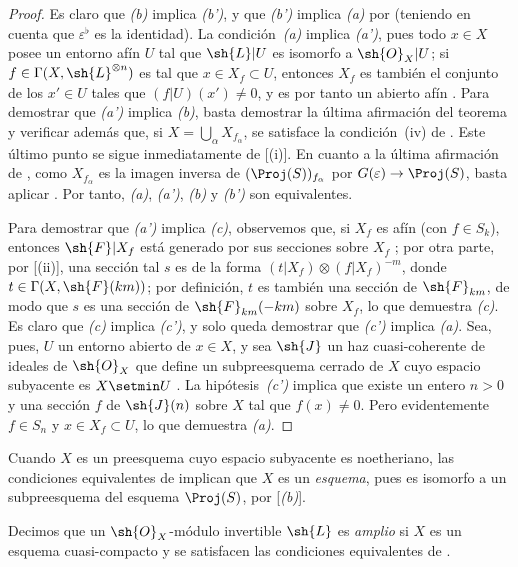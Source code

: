\documentclass[oneside,10pt]{amsart}
\makeatletter
\newcommand{\ega@arrow}[2]{\mathchoice{#1}{#2}{#2}{#2}}
\renewcommand{\to}{\ega@arrow{\longrightarrow}{\rightarrow}}
\let\EGAOriginalLabel\label
\renewcommand{\label}[1]{\phantomsection\EGAOriginalLabel{#1}}
\makeatother
\begin{document}
\begin{proof}
Es claro que \emph{(b)} implica \emph{(b')}, y que \emph{(b')} implica \emph{(a)} por  (teniendo en cuenta que $\varepsilon^\flat$ es la identidad).
La condición~\emph{(a)} implica \emph{(a')}, pues todo $x\in X$ posee un entorno afín $U$ tal que $\sh{L}|U$ es isomorfo a $\sh{O}_X|U$;
si $f\in\Gamma(X,\sh{L}^{\otimes n})$ es tal que $x\in X_f\subset U$, entonces $X_f$ es también el conjunto de los $x'\in U$ tales que $(f|U)(x')\neq0$, y es por tanto un abierto afín .
Para demostrar que \emph{(a')} implica \emph{(b)}, basta demostrar la última afirmación del teorema y verificar además que, si $X=\bigcup_\alpha X_{f_\alpha}$, se satisface la condición~(iv) de .
Este último punto se sigue inmediatamente de [(i)].
En cuanto a la última afirmación de , como $X_{f_\alpha}$ es la imagen inversa de $(\Proj(S))_{f_\alpha}$ por $G(\varepsilon)\to\Proj(S)$, basta aplicar .
Por tanto, \emph{(a)}, \emph{(a')}, \emph{(b)} y \emph{(b')} son equivalentes.

Para demostrar que \emph{(a')} implica \emph{(c)}, observemos que, si $X_f$ es afín (con $f\in S_k$), entonces $\sh{F}|X_f$ está generado por sus secciones sobre $X_f$ ;
por otra parte, por [(ii)], una sección tal $s$ es de la forma $(t|X_f)\otimes(f|X_f)^{-m}$, donde $t\in\Gamma(X,\sh{F}(km))$;
por definición, $t$ es también una sección de $\sh{F}_{km}$, de modo que $s$ es una sección de $\sh{F}_{km}(-km)$ sobre $X_f$, lo que demuestra \emph{(c)}.
Es claro que \emph{(c)} implica \emph{(c')}, y solo queda demostrar que \emph{(c')} implica \emph{(a)}.
Sea, pues, $U$ un entorno abierto de $x\in X$, y sea $\sh{J}$ un haz cuasi-coherente de ideales de $\sh{O}_X$ que define un subpreesquema cerrado de $X$ cuyo espacio subyacente es $X\setmin U$ .
La hipótesis~\emph{(c')} implica que existe un entero $n>0$ y una sección $f$ de $\sh{J}(n)$ sobre $X$ tal que $f(x)\neq0$.
Pero evidentemente $f\in S_n$ y $x\in X_f\subset U$, lo que demuestra \emph{(a)}.
\end{proof}

Cuando $X$ es un preesquema cuyo espacio subyacente es noetheriano, las condiciones equivalentes de  implican que $X$ es un \emph{esquema}, pues es isomorfo a un subpreesquema del esquema $\Proj(S)$, por [\emph{(b)}].

\begin{definition}[4.5.3]
\label{II.4.5.3}
Decimos que un $\sh{O}_X$-módulo invertible $\sh{L}$ es \emph{amplio} si $X$ es un esquema cuasi-compacto y se satisfacen las condiciones equivalentes de .
\end{definition}
\end{document}
